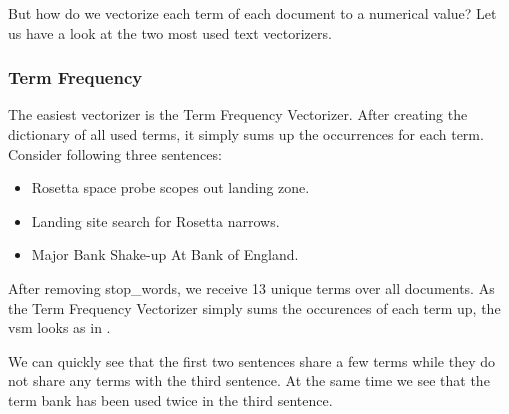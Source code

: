 But how do we vectorize each term of each document to a numerical value?
Let us have a look at the two most used text vectorizers.

\subsubsection{Term Frequency}
\label{subsubsec:3_term_frequency}

The easiest vectorizer is the Term Frequency Vectorizer.
After creating the dictionary of all used terms, it simply sums up the occurrences for each term.
Consider following three sentences:

\begin{itemize}
    \item Rosetta space probe scopes out landing zone.
    \item Landing site search for Rosetta narrows.
    \item Major Bank Shake-up At Bank of England.
\end{itemize}

After removing \Glspl{stop_word}, we receive 13 unique terms over all documents.
As the Term Frequency Vectorizer simply sums the occurences of each term up,
the \Gls{vsm} looks as in .

\begin{table}[h]
    \centering
    \caption{Term Frequency \Gls{vsm}.}
    \label{tab:tf_vsm}
\end{table}

We can quickly see that the first two sentences share a few terms
while they do not share any terms with the third sentence.
At the same time we see that the term bank has been used twice in the third sentence.

